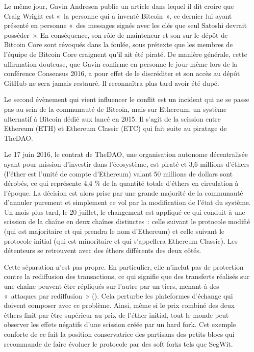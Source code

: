Le même jour, Gavin Andresen publie un article dans lequel il dit croire que Craig Wright est «~la personne qui a inventé Bitcoin~», ce dernier lui ayant présenté en personne «~des messages signés avec les clés que seul Satoshi devrait posséder~». En conséquence, son rôle de mainteneur et son  sur le dépôt de Bitcoin Core sont révoqués dans la foulée, sous prétexte que les membres de l'équipe de Bitcoin Core craignent qu'il ait été piraté. De manière générale, cette affirmation douteuse, que Gavin confirme en personne le jour-même lors de la conférence Consensus 2016, a pour effet de le discréditer et son accès au dépôt GitHub ne sera jamais restauré. Il reconnaîtra plus tard avoir été dupé.

Le second évènement qui vient influencer le conflit est un incident qui ne se passe pas au sein de la communauté de Bitcoin, mais sur Ethereum, un système alternatif à Bitcoin dédié aux  lancé en 2015. Il s'agit de la scission entre Ethereum (ETH) et Ethereum Classic (ETC) qui fait suite au piratage de TheDAO. %

Le 17 juin 2016, le contrat de TheDAO, une organisation autonome décentralisée ayant pour mission d'investir dans l'écosystème, est piraté et 3,6 millions d'éthers (l'éther est l'unité de compte d'Ethereum) valant 50 millions de dollars sont dérobés, ce qui représente 4,4 \% de la quantité totale d'éthers en circulation à l'époque. La décision est alors prise par une grande majorité de la communauté d'annuler purement et simplement ce vol par la modification de l'état du système. Un mois plus tard, le 20 juillet, le changement est appliqué ce qui conduit à une scission de la chaîne en deux chaînes distinctes~: celle suivant le protocole modifié (qui est majoritaire et qui prendra le nom d'Ethereum) et celle suivant le protocole initial (qui est minoritaire et qui s'appellera Ethereum Classic). Les détenteurs se retrouvent avec des éthers différents des deux côtés.

Cette séparation n'est pas propre. En particulier, elle n'inclut pas de protection contre la rediffusion des transactions, ce qui signifie que des transferts réalisés sur une chaîne peuvent être répliqués sur l'autre par un tiers, menant à des «~attaques par rediffusion~» (). Cela perturbe les plateformes d'échange qui doivent composer avec ce problème. Ainsi, même si le prix combiné des deux éthers finit par être supérieur au prix de l'éther initial, tout le monde peut observer les effets négatifs d'une scission créée par un hard fork. Cet exemple conforte de ce fait la position conservatrice des partisans des petits blocs qui recommande de faire évoluer le protocole par des soft forks tels que SegWit.

